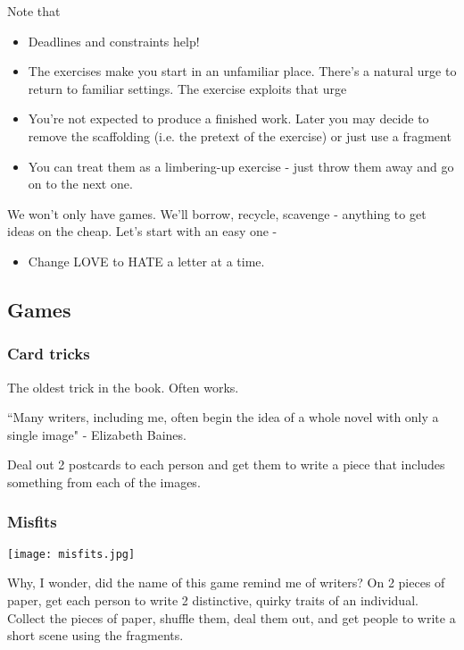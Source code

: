 \documentclass[11pt]{article}
\begin{document}
Note that
\begin{itemize}
\item Deadlines and constraints help!
\item The exercises make you start in an unfamiliar place. There's a natural urge to return to familiar settings. The exercise exploits that urge
\item You're not expected to produce a finished work. Later you may decide to remove the scaffolding (i.e. the pretext of the exercise) or just use a fragment 
\item You can treat them as a limbering-up exercise - just throw them away and go on to the next one. 
\end{itemize}

We won't only have games. We'll borrow, recycle, scavenge - anything to get ideas on the cheap. Let's start with an easy one -

\begin{itemize}
\item Change LOVE to HATE a letter at a time. 
\end{itemize}

\subsection*{Games}
\subsubsection*{Card tricks}
The oldest trick in the book. Often works.

``Many writers, including me, often begin the idea of a whole novel with only a single image" - Elizabeth Baines. 

Deal out 2 postcards to each person and get them to write a piece that includes something from each of the images.


\subsubsection*{Misfits}

\texttt{[image: misfits.jpg]}

Why, I wonder, did the name of this game remind me of writers? On 2 pieces of paper, get each person to write 2 distinctive, quirky traits of an individual. Collect the pieces of paper, shuffle them, deal them out, and get people to write a short scene using the fragments.
\end{document}
